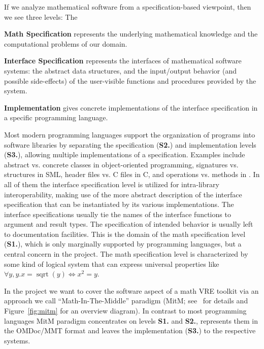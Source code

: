 If we analyze mathematical software from a specification-based viewpoint, then we see
three levels: The 
\begin{compactenum}[\rm\bf S1.]
\item \textbf{Math Specification} represents the underlying mathematical knowledge and
  the computational problems of our domain.
\item \textbf{Interface Specification} represents the interfaces of mathematical software
  systems: the abstract data structures, and the input/output behavior (and possible
  side-effects) of the user-visible functions and procedures provided by the system.
\item \textbf{Implementation} gives concrete implementations of the interface
  specification in a specific programming language.
\end{compactenum}
Most modern programming languages support the organization of programs into software
libraries by separating the specification (\textbf{S2.}) and implementation levels
(\textbf{S3.}), allowing multiple implementations of a specification. Examples include
abstract vs. concrete classes in object-oriented programming, signatures vs. structures in
SML, header files vs. C files in C, and operations vs. methods in \GAP. In all of them the
interface specification level is utilized for intra-library interoperability, making use
of the more abstract description of the interface specification that can be instantiated
by its various implementations. The interface specifications usually tie the names of the
interface functions to argument and result types. The specification of intended behavior
is usually left to documentation facilities. This is the domain of the math specification
level (\textbf{S1.}), which is only marginally supported by programming languages, but a
central concern in the \pn project. The math specification level is characterized by some
kind of logical system that can express universal properties like
$\forall y,y. x=\operatorname{sqrt}(y) \Leftrightarrow x^2=y$.

In the \pn project we want to cover the software aspect of a math VRE toolkit via an
approach we call ``Math-In-The-Middle'' paradigm (MitM; see~\cite{DehKohKon:iop16} for
details and Figure~\ref{fig:mitm} for an overview diagram). In contrast to most
programming languages MitM paradigm concentrates on levels \textbf{S1.} and \textbf{S2.},
represents them in the OMDoc/MMT format and leaves the implementation (\textbf{S3.}) to
the respective systems.

